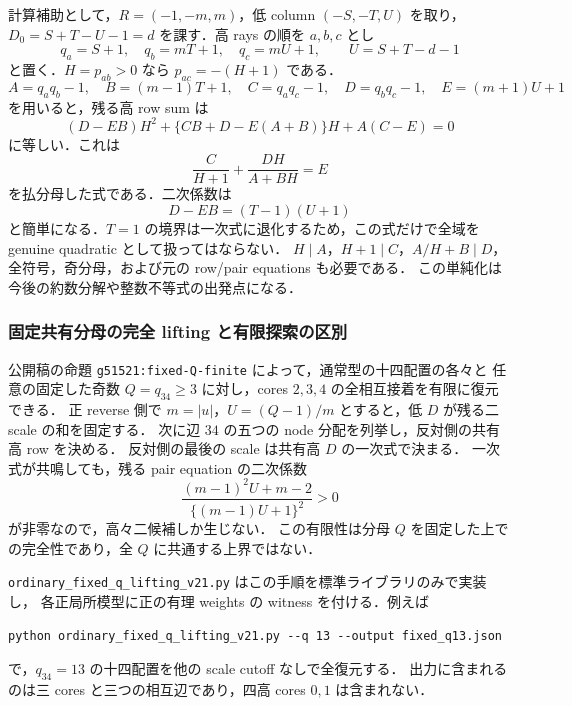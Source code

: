 計算補助として，$R=(-1,-m,m)$，低 column $(-S,-T,U)$ を取り，
$D_0=S+T-U-1=d$ を課す．高 rays の順を $a,b,c$ とし
\[
 q_a=S+1,\quad q_b=mT+1,\quad q_c=mU+1,
 \qquad U=S+T-d-1
\]
と置く．$H=p_{ab}>0$ なら $p_{ac}=-(H+1)$ である．
\[
 A=q_aq_b-1,\quad B=(m-1)T+1,\quad
 C=q_aq_c-1,\quad D=q_bq_c-1,\quad E=(m+1)U+1
\]
を用いると，残る高 row sum は
\begin{equation}\label{ng51521:simplified-quadratic}
 (D-EB)H^2+\{CB+D-E(A+B)\}H+A(C-E)=0
\end{equation}
に等しい．これは
\[
 \frac C{H+1}+\frac{DH}{A+BH}=E
\]
を払分母した式である．二次係数は
\[
 D-EB=(T-1)(U+1)
\]
と簡単になる．$T=1$ の境界は一次式に退化するため，この式だけで全域を genuine quadratic として扱ってはならない．
$H\mid A$，$H+1\mid C$，$A/H+B\mid D$，全符号，奇分母，および元の row/pair equations も必要である．
この単純化は今後の約数分解や整数不等式の出発点になる．

\subsubsection{固定共有分母の完全 lifting と有限探索の区別}

公開稿の命題 \texttt{g51521:fixed-Q-finite} によって，通常型の十四配置の各々と
任意の固定した奇数 $Q=q_{34}\ge3$ に対し，cores $2,3,4$ の全相互接着を有限に復元できる．
正 reverse 側で $m=|u|$，$U=(Q-1)/m$ とすると，低 $D$ が残る二 scale の和を固定する．
次に辺 $34$ の五つの node 分配を列挙し，反対側の共有高 row を決める．
反対側の最後の scale は共有高 $D$ の一次式で決まる．
一次式が共鳴しても，残る pair equation の二次係数
\[
 \frac{(m-1)^2U+m-2}{\{(m-1)U+1\}^2}>0
\]
が非零なので，高々二候補しか生じない．
この有限性は分母 $Q$ を固定した上での完全性であり，全 $Q$ に共通する上界ではない．

\nolinkurl{ordinary_fixed_q_lifting_v21.py} はこの手順を標準ライブラリのみで実装し，
各正局所模型に正の有理 weights の witness を付ける．例えば
\begin{verbatim}
python ordinary_fixed_q_lifting_v21.py --q 13 --output fixed_q13.json
\end{verbatim}
で，$q_{34}=13$ の十四配置を他の scale cutoff なしで全復元する．
出力に含まれるのは三 cores と三つの相互辺であり，四高 cores $0,1$ は含まれない．


